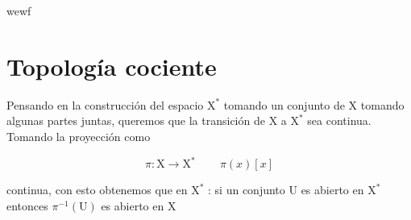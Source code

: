 \begin{exa}
wewf
\end{exa}


\section{Topología cociente}
Pensando en la construcción del espacio $\mathrm{X}^{*}$ tomando un conjunto de $\mathrm{X}$ tomando algunas partes juntas, queremos que la transición de $\mathrm{X}$ a $\mathrm{X}^{*}$ sea continua. Tomando la proyección como 

\begin{equation*}
\pi : \mathrm{X} \rightarrow \mathrm{X}^{*} \,\,\,\,\,\,\,\,\,\,\,\,\, \pi(x) [x]
\end{equation*}

continua, con esto obtenemos que en $\mathrm{X}^{*}$ : si un conjunto $\mathrm{U}$ es abierto en $\mathrm{X}^{*}$  entonces $\pi^{-1}(\mathrm{U})$ es abierto en $\mathrm{X}$ 



